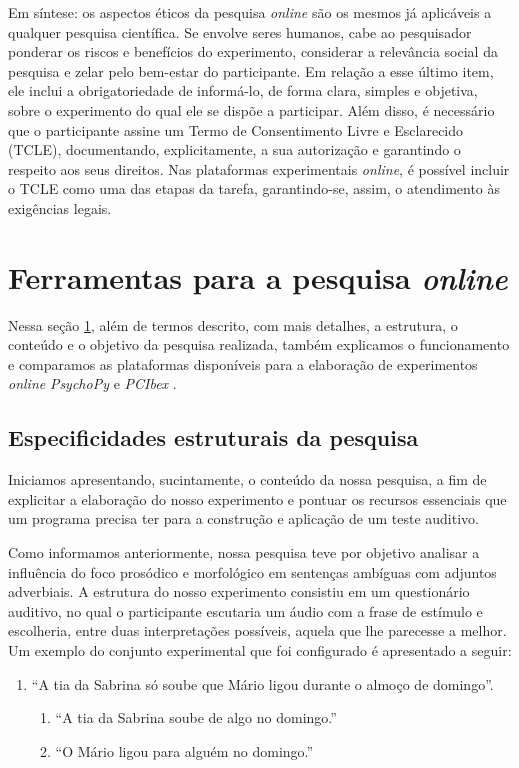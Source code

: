 \documentclass{textolivre}
\begin{document}
Em síntese: os aspectos éticos da pesquisa \textit{online} são os mesmos já aplicáveis a qualquer pesquisa científica. Se envolve seres humanos, cabe ao pesquisador ponderar os riscos e benefícios do experimento, considerar a relevância social da pesquisa e zelar pelo bem-estar do participante. Em relação a esse último item, ele inclui a obrigatoriedade de informá-lo, de forma clara, simples e objetiva, sobre o experimento do qual ele se dispõe a participar. Além disso, é necessário que o participante assine um Termo de Consentimento Livre e Esclarecido (TCLE), documentando, explicitamente, a sua autorização e garantindo o respeito aos seus direitos. Nas plataformas experimentais \textit{online}, é possível incluir o TCLE como uma das etapas da tarefa, garantindo-se, assim, o atendimento às exigências legais.

\section{Ferramentas para a pesquisa \textit{online}}\label{sec-ferramentas}
Nessa seção {\ref{sec-ferramentas}}, além de termos descrito, com mais detalhes, a estrutura, o conteúdo e o objetivo da pesquisa realizada, também explicamos o funcionamento e comparamos as plataformas disponíveis para a elaboração de experimentos \textit{online} \emph{PsychoPy} e \emph{PCIbex} \cite{peirce2007, zehr2018}.

\subsection{Especificidades estruturais da pesquisa}
Iniciamos apresentando, sucintamente, o conteúdo da nossa pesquisa, a fim de explicitar a elaboração do nosso experimento e pontuar os recursos essenciais que um programa precisa ter para a construção e aplicação de um teste auditivo.

Como informamos anteriormente, nossa pesquisa teve por objetivo analisar a influência do foco prosódico e morfológico em sentenças ambíguas com adjuntos adverbiais. A estrutura do nosso experimento consistiu em um questionário auditivo, no qual o participante escutaria um áudio com a frase de estímulo e escolheria, entre duas interpretações possíveis, aquela que lhe parecesse a melhor. Um exemplo do conjunto experimental que foi configurado é apresentado a seguir:

\begin{enumerate}[label={(\arabic*)},leftmargin=2\parindent,topsep=10pt,resume]
\item\label{exemplo2} “A tia da Sabrina só soube que Mário ligou durante o almoço de domingo”.
\begin{enumerate}
\item\label{exemplo2a} “A tia da Sabrina soube de algo no domingo.”
\item\label{exemplo2b} “O Mário ligou para alguém no domingo.”
\end{enumerate}
\end{enumerate}
\end{document}
